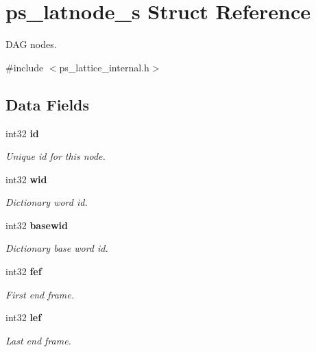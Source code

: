 \section{ps\+\_\+latnode\+\_\+s Struct Reference}
\label{structps__latnode__s}


D\+AG nodes.  




{\ttfamily \#include $<$ps\+\_\+lattice\+\_\+internal.\+h$>$}

\subsection*{Data Fields}
\begin{DoxyCompactItemize}
\item 
\mbox{\label{structps__latnode__s_a78243b37753f7a209c15d6adf98ee3f7}} 
int32 \textbf{ id}
\begin{DoxyCompactList}\small\item\em Unique id for this node. \end{DoxyCompactList}\item 
\mbox{\label{structps__latnode__s_afd85dbd410d6e6d970c73088bc6fb97e}} 
int32 \textbf{ wid}
\begin{DoxyCompactList}\small\item\em Dictionary word id. \end{DoxyCompactList}\item 
\mbox{\label{structps__latnode__s_ae3b3dc7d14347e6380859c74b9a02589}} 
int32 \textbf{ basewid}
\begin{DoxyCompactList}\small\item\em Dictionary base word id. \end{DoxyCompactList}\item 
\mbox{\label{structps__latnode__s_a584ee5a303355d851ac903718998df14}} 
int32 \textbf{ fef}
\begin{DoxyCompactList}\small\item\em First end frame. \end{DoxyCompactList}\item 
\mbox{\label{structps__latnode__s_a5c7b9114d131151d6ce85228ea9f829d}} 
int32 \textbf{ lef}
\begin{DoxyCompactList}\small\item\em Last end frame. \end{DoxyCompactList}\item 
\mbox{\label{structps__latnode__s_a4171e956043e7856c04d84498f16cf29}} 

\end{DoxyCompactItemize}
